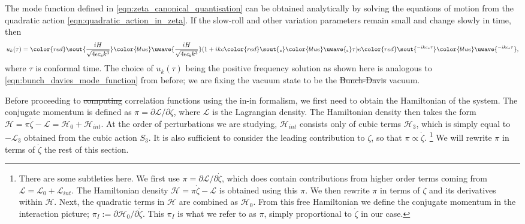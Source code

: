 \documentclass[a4paper,12pt,times,custombib,print,index]{Classes/PhDThesisPSnPDF} %
\providecommand{\DIFadd}[1]{{\protect\color{blue}\uwave{#1}}} %
\providecommand{\DIFdel}[1]{{\protect\color{red}\sout{#1}}}                      %
\providecommand{\DIFaddbegin}{} %
\providecommand{\DIFaddend}{} %
\providecommand{\DIFdelbegin}{} %
\providecommand{\DIFdelend}{} %
\newcommand{\DIFscaledelfig}{0.5}
\newlength{\DIFdelgraphicswidth} %
\newlength{\DIFdelgraphicsheight} %
\newcommand{\DIFaddincludegraphics}[2][]{{\color{blue}\fbox{\DIFOincludegraphics[#1]{#2}}}} %
\newcommand{\DIFdelincludegraphics}[2][]{%
\sbox{\DIFdelgraphicsbox}{\DIFOincludegraphics[#1]{#2}}%
\settoboxwidth{\DIFdelgraphicswidth}{\DIFdelgraphicsbox} %
\settoboxtotalheight{\DIFdelgraphicsheight}{\DIFdelgraphicsbox} %
\scalebox{\DIFscaledelfig}{%
\parbox[b]{\DIFdelgraphicswidth}{\usebox{\DIFdelgraphicsbox}\\[-\baselineskip] \rule{\DIFdelgraphicswidth}{0em}}\llap{\resizebox{\DIFdelgraphicswidth}{\DIFdelgraphicsheight}{%
\setlength{\unitlength}{\DIFdelgraphicswidth}%
\begin{picture}(1,1)%
\thicklines\linethickness{2pt} %
{\color[rgb]{1,0,0}\put(0,0){\framebox(1,1){}}}%
{\color[rgb]{1,0,0}\put(0,0){\line( 1,1){1}}}%
{\color[rgb]{1,0,0}\put(0,1){\line(1,-1){1}}}%
\end{picture}%
}\hspace*{3pt}}} %
} %
\DeclareRobustCommand{\DIFaddbegin}{\DIFOaddbegin \let\includegraphics\DIFaddincludegraphics} %
\DeclareRobustCommand{\DIFaddend}{\DIFOaddend \let\includegraphics\DIFOincludegraphics} %
\DeclareRobustCommand{\DIFdelbegin}{\DIFOdelbegin \let\includegraphics\DIFdelincludegraphics} %
\DeclareRobustCommand{\DIFdelend}{\DIFOaddend \let\includegraphics\DIFOincludegraphics} %
\begin{document}
The mode function defined in \eqref{eqn:zeta_canonical_quantisation} can be obtained analytically by solving the equations of motion from the quadratic action \eqref{eqn:quadratic_action_in_zeta}. If the slow-roll and other variation parameters remain small and change slowly in time, then
\begin{align}
	u_k(\tau) = \DIFdelbegin \DIFdel{\frac{iH}{\sqrt{4\epsilon c_s k^3}} }\DIFdelend \DIFaddbegin \DIFadd{\frac{iH}{\sqrt{4\epsilon c_\text{s} k^3}} }\DIFaddend (1 + ikc\DIFdelbegin \DIFdel{_s }\DIFdelend \DIFaddbegin \DIFadd{_\text{s} }\DIFaddend \tau) e\DIFdelbegin \DIFdel{^{-ikc_s \tau}}\DIFdelend \DIFaddbegin \DIFadd{^{-ikc_\text{s} \tau}}\DIFaddend ,
\end{align}
where $\tau$ is conformal time. The choice of $u_k(\tau)$ being the positive frequency solution as shown here is analogous to \DIFdelbegin %
\DIFdelend \DIFaddbegin \eqref{eqn:bunch_davies_mode_function} \DIFaddend from before; we are fixing the vacuum state to be the \DIFdelbegin \DIFdel{Bunch-Davis }\DIFdelend \DIFaddbegin \DIFadd{Bunch-Davies }\DIFaddend vacuum.

Before proceeding to \DIFdelbegin \DIFdel{computing }\DIFdelend \DIFaddbegin \DIFadd{compute }\DIFaddend correlation functions using the in-in formalism, we first need to obtain the Hamiltonian of the system. The conjugate momentum is defined as $\pi = \partial \mathcal{L} / \partial \dot{\zeta}$, where $\mathcal{L}$ is the Lagrangian density. The Hamiltonian density then takes the form \DIFdelbegin \DIFdel{$\mathcal{H} = \pi \dot{\zeta} - \mathcal{L} = \mathcal{H}_0 + \mathcal{H}_{int}$}\DIFdelend \DIFaddbegin \DIFadd{$\mathcal{H} = \pi \dot{\zeta} - \mathcal{L} = \mathcal{H}_0 + \mathcal{H}_\text{int}$}\DIFaddend . At the order of perturbations we are studying, \DIFdelbegin \DIFdel{$\mathcal{H}_{int}$ }\DIFdelend \DIFaddbegin \DIFadd{$\mathcal{H}_\text{int}$ }\DIFaddend consists only of cubic terms $\mathcal{H}_3$, which is simply equal to $-\mathcal{L}_3$ obtained from the cubic action $S_3$. It is also sufficient to consider the leading contribution to $\zeta$, so that $\pi \propto \dot{\zeta}$.
\footnote{There are some subtleties here. We first use $\pi = \partial \mathcal{L} / \partial \dot{\zeta}$, which does contain contributions from higher order terms coming from $\mathcal{L}=\mathcal{L}_0 + \mathcal{L}_{int}$. The Hamiltonian density $\mathcal{H} = \pi \dot{\zeta} - \mathcal{L}$ is obtained using this $\pi$. We then rewrite $\pi$ in terms of $\zeta$ and its derivatives within $\mathcal{H}$. Next, the quadratic terms in $\mathcal{H}$ are combined as $\mathcal{H}_0$. From this free Hamiltonian we define the conjugate momentum in the interaction picture; $\pi_I :=  \partial \mathcal{H}_0 / \partial \dot{\zeta}$. This $\pi_I$ is what we refer to as $\pi$, simply proportional to $\dot{\zeta}$ in our case.}
We will rewrite $\pi$ in terms of $\dot{\zeta}$ the rest of this section.
\end{document}
